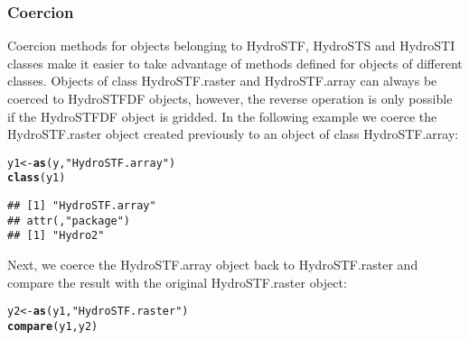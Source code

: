 \documentclass{icldt}\usepackage[]{graphicx}\usepackage[]{color}
\makeatletter
\newcommand{\hlstr}[1]{\textcolor[rgb]{0.192,0.494,0.8}{#1}}%
\newcommand{\hlstd}[1]{\textcolor[rgb]{0.345,0.345,0.345}{#1}}%
\newcommand{\hlkwb}[1]{\textcolor[rgb]{0.69,0.353,0.396}{#1}}%
\newcommand{\hlkwd}[1]{\textcolor[rgb]{0.737,0.353,0.396}{\textbf{#1}}}%
\newenvironment{kframe}{%
 \def\at@end@of@kframe{}%
 \ifinner\ifhmode%
  \def\at@end@of@kframe{\end{minipage}}%
  \begin{minipage}{\columnwidth}%
 \fi\fi%
 \def\FrameCommand##1{\hskip\@totalleftmargin \hskip-\fboxsep
 \colorbox{shadecolor}{##1}\hskip-\fboxsep
     \hskip-\linewidth \hskip-\@totalleftmargin \hskip\columnwidth}%
 \MakeFramed {\advance\hsize-\width
   \@totalleftmargin\z@ \linewidth\hsize
   \@setminipage}}%
 {\par\unskip\endMakeFramed%
 \at@end@of@kframe}
\newenvironment{knitrout}{}{} %
\makeatother
\begin{document}

\subsubsection{Coercion}
Coercion methods for objects belonging to HydroSTF, HydroSTS and HydroSTI classes make it easier to take advantage of methods defined for objects of different classes. Objects of class HydroSTF.raster and HydroSTF.array can always be coerced to HydroSTFDF objects, however, the reverse operation is only possible if the HydroSTFDF object is gridded. In the following example we coerce the HydroSTF.raster object created previously to an object of class HydroSTF.array:

\begin{knitrout}
\color{fgcolor}\begin{kframe}
\begin{alltt}
\hlstd{y1} \hlkwb{<-} \hlkwd{as}\hlstd{(y,} \hlstr{"HydroSTF.array"}\hlstd{)}
\hlkwd{class}\hlstd{(y1)}
\end{alltt}
\begin{verbatim}
## [1] "HydroSTF.array"
## attr(,"package")
## [1] "Hydro2"
\end{verbatim}
\end{kframe}
\end{knitrout}

\noindent Next, we coerce the HydroSTF.array object back to HydroSTF.raster and compare the result with the original HydroSTF.raster object:

\begin{knitrout}
\color{fgcolor}\begin{kframe}
\begin{alltt}
\hlstd{y2} \hlkwb{<-} \hlkwd{as}\hlstd{(y1,} \hlstr{"HydroSTF.raster"}\hlstd{)}
\hlkwd{compare}\hlstd{(y1, y2)}
\end{alltt}


{\ttfamily\noindent\bfseries\color{errorcolor}{\#\# Error in compare\_ST(x, ..., extent = extent, coords = coords, crs = crs, : different ST classes}}\end{kframe}
\end{knitrout}
\end{document}
